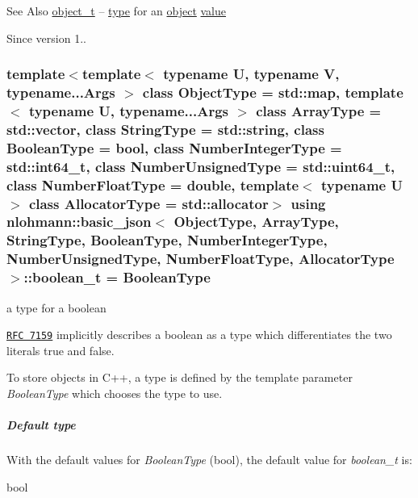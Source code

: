 \begin{DoxySeeAlso}{See Also}
\hyperlink{classnlohmann_1_1basic__json_a0ac9894c9de8dc551cf2e5f1c605537f}{object\-\_\-t} -- \hyperlink{classnlohmann_1_1basic__json_a5d466b240d0ba9f648d7fd4ff42359f5}{type} for an \hyperlink{classnlohmann_1_1basic__json_ad25b2f8c21e241e2d63455537a9294ff}{object} \hyperlink{classnlohmann_1_1basic__json_a0a2cbbd95862a623e7dc5c37e67dead0}{value}
\end{DoxySeeAlso}
\begin{DoxySince}{Since}
version 1.. 
\end{DoxySince}
\hypertarget{classnlohmann_1_1basic__json_af3bc3e83aa162d7ba4df16a949872723}{
\subsubsection[{boolean\-\_\-t}]{\setlength{\rightskip}{0pt plus 5cm}template$<$template$<$ typename U, typename V, typename...\-Args $>$ class Object\-Type = std\-::map, template$<$ typename U, typename...\-Args $>$ class Array\-Type = std\-::vector, class String\-Type  = std\-::string, class Boolean\-Type  = bool, class Number\-Integer\-Type  = std\-::int64\-\_\-t, class Number\-Unsigned\-Type  = std\-::uint64\-\_\-t, class Number\-Float\-Type  = double, template$<$ typename U $>$ class Allocator\-Type = std\-::allocator$>$ using {\bf nlohmann\-::basic\-\_\-json}$<$ Object\-Type, Array\-Type, String\-Type, Boolean\-Type, Number\-Integer\-Type, Number\-Unsigned\-Type, Number\-Float\-Type, Allocator\-Type $>$\-::{\bf boolean\-\_\-t} =  Boolean\-Type}}\label{classnlohmann_1_1basic__json_af3bc3e83aa162d7ba4df16a949872723}


a type for a boolean 

\href{http://rfc7159.net/rfc7159}{\tt R\-F\-C 7159} implicitly describes a boolean as a type which differentiates the two literals {\ttfamily true} and {\ttfamily false}.

To store objects in C++, a type is defined by the template parameter {\itshape Boolean\-Type} which chooses the type to use.

\subparagraph*{Default type}

With the default values for {\itshape Boolean\-Type} ({\ttfamily bool}), the default value for {\itshape boolean\-\_\-t} is\-:


\begin{DoxyCode}
\textcolor{keywordtype}{bool}
\end{DoxyCode}


